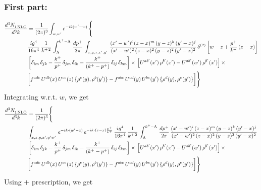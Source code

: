 \documentclass[9pt]{article}
\numberwithin{equation}{section}
\begin{document}
\subsubsection{First part:}
\begin{align}
    \frac{d^{3}N_{1\,\rm NLO}^{\rm}}{d^{3}k}  & = \frac{1}{(2\pi)^{3}}  \int_{w, w^\prime} e^{-ik(w^\prime-w)}\, \Bigg\{\notag \\ & \frac{ig^{4}}{16\pi^{4}}\, \frac{1}{k^{+\,2}}\,\int_{\Lambda}^{k^{+}-\Lambda}\, \frac{dp^{+}}{2\pi}\,\int_{x,y,z,x',y'}\,\frac{(x'-w')^{i}\,(z-x)^{m}\,(y-z)^{k}\,(y'-x)^{j}}{(x'-w')^{2}\,(z-x)^{2}\,(y-z)^{2}\,(y'-x)^{2}}\, \delta^{(2)}\left[w-z+\frac{p^{+}}{k^{+}}\,(z-x)\right]\notag \\ & \left[\delta_{im}\,\delta_{jk}-\frac{k^{+}}{p^{+}}\, \delta_{jm}\,\delta_{ik}-\frac{k^{+}}{(k^{+}-p^{+})}\, \delta_{ij}\,\delta_{km}\right]\times\, \left[U^{ab'}(x')\,\rho^{b'}(x')-U^{ab'}(w')\,\rho^{b'}(x')\right]\times\notag \\ & \bigg[f^{adc}\,U^{db}(x)\,U^{ce}(z)\, \{\rho^{e}(y),\rho^{b}(y')\}-f^{abc}\,U^{cd}(y)\,U^{be}(y')\, \{\rho^{d}(y),\rho^{e}(y')\}\bigg]\Bigg\}
\end{align}
Integrating w.r.t. $w$, we get
\begin{align}
     \frac{d^{3}N_{1\,\rm NLO}^{\rm}}{d^{3}k}  & = \frac{1}{(2\pi)^{3}} \Bigg\{\notag \\ &  \int_{x,z,y,x',y'w'}\,e^{-ik\cdot (w^\prime-z)}\,e^{-ik\cdot (z-x)\frac{p^{+}}{k^{+}}}\,\frac{ig^{4}}{16\pi^{4}}\, \frac{1}{k^{+\,2}}\,\int_{\Lambda}^{k^{+}-\Lambda}\, \frac{dp^{+}}{2\pi}\,\frac{(x'-w')^{i}\,(z-x)^{m}\,(y-z)^{k}\,(y'-x)^{j}}{(x'-w')^{2}\,(z-x)^{2}\,(y-z)^{2}\,(y'-x)^{2}}\,\notag \\ & \left[\delta_{im}\,\delta_{jk}-\frac{k^{+}}{p^{+}}\, \delta_{jm}\,\delta_{ik}-\frac{k^{+}}{(k^{+}-p^{+})}\, \delta_{ij}\,\delta_{km}\right]\times\, \left[U^{ab'}(x')\,\rho^{b'}(x')-U^{ab'}(w')\,\rho^{b'}(x')\right]\times\notag \\ & \bigg[f^{adc}\,U^{db}(x)\,U^{ce}(z)\, \{\rho^{e}(y),\rho^{b}(y')\}-f^{abc}\,U^{cd}(y)\,U^{be}(y')\, \{\rho^{d}(y),\rho^{e}(y')\}\bigg]\Bigg\}
\end{align}
Using $+$ prescription, we get
\end{document}
